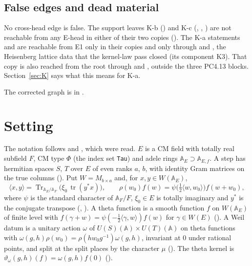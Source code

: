 \documentclass[11pt]{article}
\newcommand{\A}{\mathbb A}
\newcommand{\Tr}{\operatorname{Tr}}
\newcommand{\tr}{\operatorname{tr}}
\theoremstyle{remark}
\begin{document}
\subsection{False edges and dead material}
No cross-head edge is false. The support leaves K-b () and K-c (, , ) are not reachable from any E-head in either of their two copies (). The K-a statements  and  are reachable from E1 only in their  copies and only through  and , the Heisenberg lattice data that the kernel-law pass closed (its component K3). That copy is also reached from the root through  and , outside the three PC4.13 blocks. Section~\ref{sec:K} says what this means for K-a.

The corrected graph is in .

\section{Setting}\label{sec:set}

The notation follows  and , which were read. $E$ is a CM field with totally real subfield $F$, CM type $\Phi$ (the index set \texttt{Tau}) and adele rings $\A_E\supset\A_{E,f}$. A step has hermitian spaces $S$, $T$ over $E$ of even ranks $a$, $b$, with identity Gram matrices on the true columns (). Put $W=M_{b\times a}$ and, for $x,y\in W(\A_E)$,
\[
\langle x,y\rangle=\Tr_{\A_E/\A_F}\bigl(\xi_0\,\tr(y^*x)\bigr),\qquad \rho(w_0)f(w)=\psi\bigl(\tfrac12\langle w,w_0\rangle\bigr)f(w+w_0),
\]
where $\psi$ is the standard character of $\A_F/F$, $\xi_0\in E$ is totally imaginary and $y^*$ is the conjugate transpose (, ). A theta function is a smooth function $f$ on $W(\A_E)$ of finite level with $f(\gamma+w)=\psi(-\tfrac12\langle\gamma,w\rangle)f(w)$ for $\gamma\in W(E)$ (). A Weil datum is a unitary action $\omega$ of $U(S)(\A)\times U(T)(\A)$ on theta functions with $\omega(g,h)\rho(w_0)=\rho(hw_0g^{-1})\omega(g,h)$, invariant at $0$ under rational points, and split at the split places by the character $\mu$ (). The theta kernel is $\vartheta_\omega(g,h)(f)=\omega(g,h)f(0)$ ().
\end{document}
